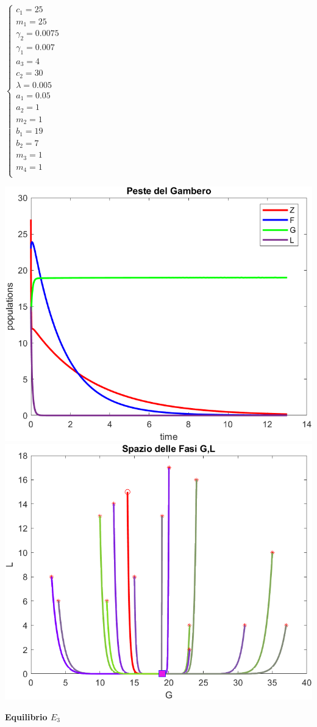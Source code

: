 \documentclass[12pt,a4paper]{article}
\numberwithin{theorem}{section}
\numberwithin{definition}{section}
\numberwithin{example}{section}
\newcommand{\deftitle}[1]{{\color{red}\bf{#1}\color{black}}}
\begin{document}
\begin{minipage}{0.2\textwidth}


$\begin{cases}
	c_1=25\\
	m_1=25\\
	\gamma_2=0.0075\\
	\gamma_1=0.007\\
	a_3=4\\
	c_2=30\\
	\lambda=0.005\\ %
	a_1=0.05\\
	a_2=1\\
	m_2=1\\
	b_1=19\\
	b_2=7\\
	m_3=1\\
	m_4=1\\
	
\end{cases}$ \\
\end{minipage}
\begin{minipage}{0.7\textwidth}
    \centering
    \includegraphics[width=6 cm]{grafici/E2_fasi.png} 
    \\
    \includegraphics[width=6 cm]{grafici/E2_ritratto.png}
\end{minipage}

\newpage

\deftitle{Equilibrio $E_3$}
\end{document}
